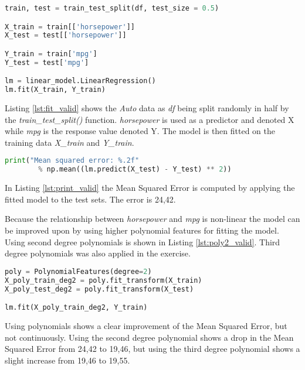 \begin{lstlisting}[language=Python, label=lst:fit_valid, caption=Fit linear regression]
train, test = train_test_split(df, test_size = 0.5)

X_train = train[['horsepower']]
X_test = test[['horsepower']]

Y_train = train['mpg']
Y_test = test['mpg']

lm = linear_model.LinearRegression()
lm.fit(X_train, Y_train)
\end{lstlisting}

Listing \ref{lst:fit_valid} shows the \emph{Auto} data as \emph{df} being split randomly in half by the \emph{train\_test\_split()} function. 
\emph{horsepower} is used as a predictor and denoted X while \emph{mpg} is the response value denoted Y. The model is then fitted on the training data \emph{X\_train} and \emph{Y\_train}.

\begin{lstlisting}[language=Python, label=lst:print_valid, caption=Print Mean Squeared Error]
print("Mean squared error: %.2f" 
		% np.mean((lm.predict(X_test) - Y_test) ** 2))
\end{lstlisting}

In Listing \ref{lst:print_valid} the Mean Squared Error is computed by applying the fitted model to the test sets. The error is 24,42. 

Because the relationship between \emph{horsepower} and \emph{mpg} is non-linear the model can be improved upon by using higher polynomial features for fitting the model. Using second degree polynomials is shown in Listing \ref{lst:poly2_valid}. Third degree polynomials was also applied in the exercise.

\begin{lstlisting}[language=Python, label=lst:poly2_valid, caption=Polynomial features with degree = 2]
poly = PolynomialFeatures(degree=2)
X_poly_train_deg2 = poly.fit_transform(X_train)
X_poly_test_deg2 = poly.fit_transform(X_test)

lm.fit(X_poly_train_deg2, Y_train)
\end{lstlisting}

Using polynomials shows a clear improvement of the Mean Squared Error, but not continuously. Using the second degree polynomial shows a drop in the Mean Squared Error from 24,42 to 19,46, but using the third degree polynomial shows a slight increase from 19,46 to 19,55. 

